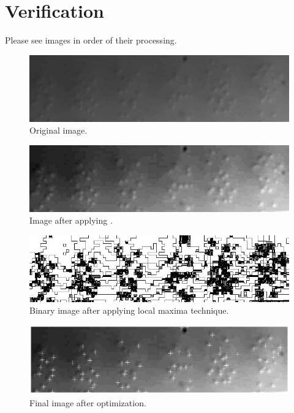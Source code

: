\documentclass[14pt, letterpaper]{article}
\begin{document}
\section{Verification}
Please see images in order of their processing.
\begin{figure}[!htbp]
	\centering
	\includegraphics[totalheight=3cm]{./images/01_Gray8bit.jpg}
	\caption{Original image.}
	\label{fig:origImage}
\end{figure}
\begin{figure}[!htbp]
	\centering
	\includegraphics[totalheight=3cm]{./images/02_maxFlt.jpg}
	\caption{Image after applying .}
	\label{fig:maxFltImage}
\end{figure}
\begin{figure}[!htbp]
	\centering
	\includegraphics[totalheight=3cm]{./images/03_LocalMax.jpg}
	\caption{Binary image after applying local maxima technique.}
	\label{fig:localMaxImage}
\end{figure}
\begin{figure}[!htbp]
	\centering
	\includegraphics[totalheight=3cm]{./images/04_FinalBumps.jpg}
	\caption{Final image after optimization.}
	\label{fig:finalImage}
\end{figure}
\newpage
\end{document}
